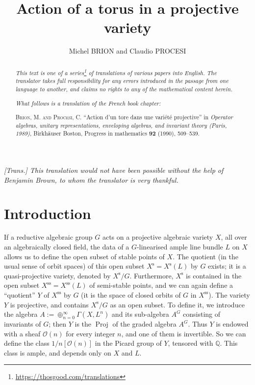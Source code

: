 \documentclass{article}
\title{Action of a torus in a projective variety}
\author{Michel BRION and Claudio PROCESI}
\date{}
\newcommand{\doctype}{French book chapter}
\newcommand{\origcit}{%
  \textsc{Brion, M. and Procesi, C.}
  ``Action d'un tore dans une vari\'{e}t\'{e} projective''
  in \emph{Operator algebras, unitary representations, enveloping algebras, and invariant theory (Paris, 1989)}, Birkh\"{a}user Boston, Progress in mathematics \textbf{92} (1990), 509--539.%
}
\newcommand{\scr}[1]{{\mathscr{#1}}}
\newcommand{\s}{\mathrm{s}}
\renewcommand{\ss}{\mathrm{ss}}
\DeclareMathOperator{\Proj}{Proj}
\begin{document}
\maketitle
\thispagestyle{fancy}

\renewcommand{\abstractname}{Translator's note.}

\begin{abstract}
  \renewcommand*{\thefootnote}{\fnsymbol{footnote}}
  \emph{This text is one of a series\footnote{\url{https://thosgood.com/translations}} of translations of various papers into English.}
  \emph{The translator takes full responsibility for any errors introduced in the passage from one language to another, and claims no rights to any of the mathematical content herein.}

  \medskip
  
  \emph{What follows is a translation of the \doctype:}

  \medskip\noindent
  \origcit
\end{abstract}

\setcounter{footnote}{0}

\tableofcontents
\bigskip



\emph{[Trans.] This translation would not have been possible without the help of Benjamin Brown, to whom the translator is very thankful.}

\section*{Introduction}
\label{introduction}

If a reductive algebraic group $G$ acts on a projective algebraic variety $X$, all over an algebraically closed field, the data of a $G$-linearised ample line bundle $L$ on $X$ allows us to define the open subset of stable points of $X$.
The quotient (in the usual sense of orbit spaces) of this open subset $X^\s=X^\s(L)$ by $G$ exists;
it is a quasi-projective variety, denoted by $X^\s/G$.
Furthermore, $X^\s$ is contained in the open subset $X^\ss=X^\ss(L)$ of semi-stable points, and we can again define a ``quotient'' $Y$ of $X^\ss$ by $G$ (it is the space of closed orbits of $G$ in $X^\ss$).
The variety $Y$ is projective, and contains $X^\s/G$ as an open subset.
To define it, we introduce the algebra $A:=\oplus_{n=0}^\infty \Gamma(X,L^n)$ and its sub-algebra $A^G$ consisting of invariants of $G$;
then $Y$ is the $\Proj$ of the graded algebra $A^G$.
Thus $Y$ is endowed with a sheaf $\scr{O}(n)$ for every integer $n$, and one of them is invertible.
So we can define the class $1/n[\scr{O}(n)]$ in the Picard group of $Y$, tensored with $\mathbb{Q}$.
This class is ample, and depends only on $X$ and $L$.
\end{document}
